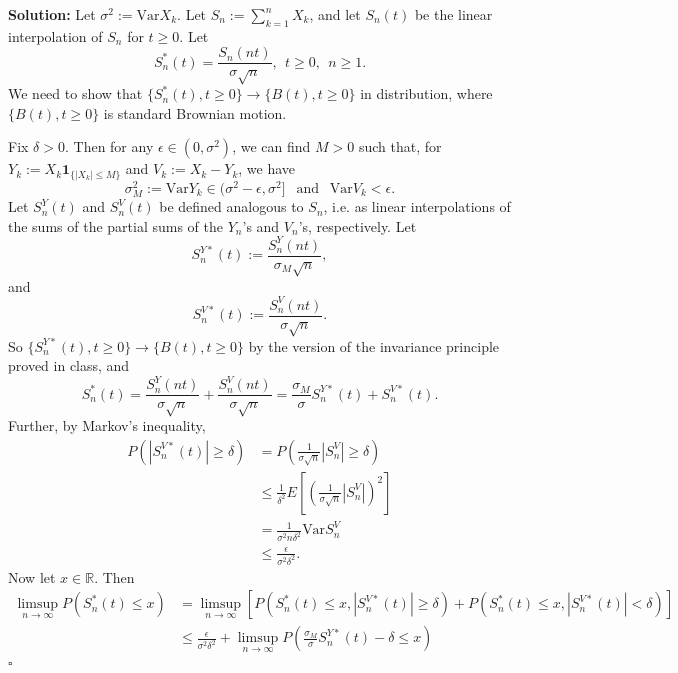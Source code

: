 \documentclass[12pt]{article}
\newcounter{ProofCounter}
\newenvironment{Solution}{\stepcounter{ProofCounter}\textbf{Solution:}}{\hfill$\square$}
\begin{document}
\begin{Solution}
  Let $\sigma^2 := \text{Var}X_k$. Let $S_n := \sum_{k=1}^n X_k$, and let $S_n(t)$ be the linear interpolation of $S_n$ for $t \geq 0$. Let 
  \[
    S_n^*(t) = \frac{S_n(nt)}{\sigma \sqrt{n}}, \ \ t \geq 0,  \ \ n \geq 1.
  \]
  We need to show that $\{ S_n^*(t) , t \geq 0 \} \rightarrow \{ B(t), t \geq 0 \}$ in distribution, where $\{ B(t), t \geq 0\}$ is standard Brownian motion.

  Fix $\delta > 0$. Then for any $\epsilon \in (0, \sigma^2)$, we can find $M > 0$ such that, for $Y_k := X_k \bm{1}_{\{|X_k| \leq M\}}$ and $V_k := X_k - Y_k$, we have
  \[
    \sigma_M^2 := \text{Var} Y_k \in (\sigma^2 - \epsilon, \sigma^2] \ \ \text{ and } \ \ \text{Var}V_k < \epsilon.
  \]
  Let $S_n^{Y}(t)$ and $S_n^{V}(t)$ be defined analogous to $S_n$, i.e. as linear interpolations of the sums of the partial sums of the $Y_n$'s and $V_n$'s, respectively. Let 
  \[
    S_n^{Y*}(t) := \frac{S_n^Y(nt)}{\sigma_M \sqrt{n}},
  \]
  and
  \[
    S_n^{V*}(t) := \frac{S_n^V(nt)}{\sigma\sqrt{n}}.
  \]
  So $\{ S_n^{Y*}(t), t \geq 0\} \rightarrow \{ B(t), t \geq 0\}$ by the version of the invariance principle proved in class, and
  \begin{equation}
    S_n^*(t) = \frac{S_n^Y(nt)}{\sigma \sqrt{n}} + \frac{S_n^V(nt)}{\sigma\sqrt{n}} = \frac{\sigma_M}{\sigma} S_n^{Y*}(t) + S_n^{V*}(t).
    \label{1.1}
  \end{equation}
  Further, by Markov's inequality,
  \begin{align}
    P \left( |S_n^{V*}(t)| \geq \delta \right) & = P \left( \frac{1}{\sigma\sqrt{n}}|S_n^V| \geq \delta \right) \nonumber \\
    & \leq \frac{1}{\delta^2} E \left[ \left( \frac{1}{\sigma \sqrt{n}}|S_n^V| \right)^2 \right] \nonumber \\
    & = \frac{1}{\sigma^2 n\delta^2} \text{Var} S_n^V \nonumber \\
    & \leq \frac{\epsilon}{\sigma^2 \delta^2}.
    \label{1.2}
  \end{align}
  Now let $x \in \mathbb{R}$. Then
  \begin{align}
    \limsup_{n\rightarrow\infty} P(S_n^*(t) \leq x) & = \limsup_{n\rightarrow\infty} \left[ P \left( S_n^*(t) \leq x, |S_n^{V*}(t)| \geq \delta \right) + P \left( S_n^*(t) \leq x, |S_n^{V*}(t)| < \delta \right) \right] \nonumber \\
    & \leq \frac{\epsilon}{\sigma^2 \delta^2} + \limsup_{n\rightarrow \infty} P \left( \frac{\sigma_M}{\sigma} S_n^{Y*}(t) - \delta \leq x \right) \nonumber \\

\end{align}
\end{Solution}
\end{document}
